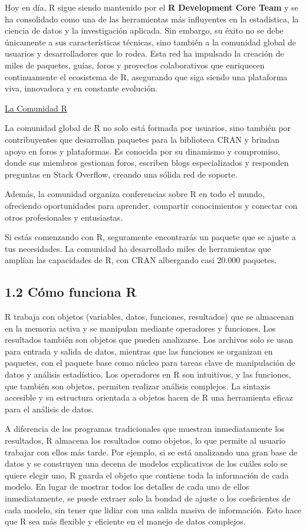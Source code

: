 \documentclass[
  letterpaper,
  DIV=11,
  numbers=noendperiod]{scrreprt}
\begin{document}
Hoy en día, R sigue siendo mantenido por el \textbf{R Development Core
Team} y se ha consolidado como una de las herramientas más influyentes
en la estadística, la ciencia de datos y la investigación aplicada. Sin
embargo, su éxito no se debe únicamente a sus características técnicas,
sino también a la comunidad global de usuarios y desarrolladores que lo
rodea. Esta red ha impulsado la creación de miles de paquetes, guías,
foros y proyectos colaborativos que enriquecen continuamente el
ecosistema de R, asegurando que siga siendo una plataforma viva,
innovadora y en constante evolución.

\uline{La Comunidad R}

La comunidad global de R no solo está formada por usuarios, sino también
por contribuyentes que desarrollan paquetes para la biblioteca CRAN y
brindan apoyo en foros y plataformas. Es conocida por su dinamismo y
compromiso, donde sus miembros gestionan foros, escriben blogs
especializados y responden preguntas en Stack Overflow, creando una
sólida red de soporte.

Además, la comunidad organiza conferencias sobre R en todo el mundo,
ofreciendo oportunidades para aprender, compartir conocimientos y
conectar con otros profesionales y entusiastas.

Si estás comenzando con R, seguramente encontrarás un paquete que se
ajuste a tus necesidades. La comunidad ha desarrollado miles de
herramientas que amplían las capacidades de R, con CRAN albergando casi
20.000 paquetes.

\hypertarget{cuxf3mo-funciona-r}{%
\subsection{1.2 Cómo funciona R}\label{cuxf3mo-funciona-r}}

R trabaja con objetos (variables, datos, funciones, resultados) que se
almacenan en la memoria activa y se manipulan mediante operadores y
funciones. Los resultados también son objetos que pueden analizarse. Los
archivos solo se usan para entrada y salida de datos, mientras que las
funciones se organizan en paquetes, con el paquete base como núcleo para
tareas clave de manipulación de datos y análisis estadístico. Los
operadores en R son intuitivos, y las funciones, que también son
objetos, permiten realizar análisis complejos. La sintaxis accesible y
su estructura orientada a objetos hacen de R una herramienta eficaz para
el análisis de datos.

A diferencia de los programas tradicionales que muestran inmediatamente
los resultados, R almacena los resultados como objetos, lo que permite
al usuario trabajar con ellos más tarde. Por ejemplo, si se está
analizando una gran base de datos y se construyen una decena de modelos
explicativos de los cuáles solo se quiere elegir uno, R guarda el objeto
que contiene toda la información de cada modelo. En lugar de mostrar
todos los detalles de cada uno de ellos inmediatamente, se puede extraer
solo la bondad de ajuste o los coeficientes de cada modelo, sin tener
que lidiar con una salida masiva de información. Esto hace que R sea más
flexible y eficiente en el manejo de datos complejos.
\end{document}
